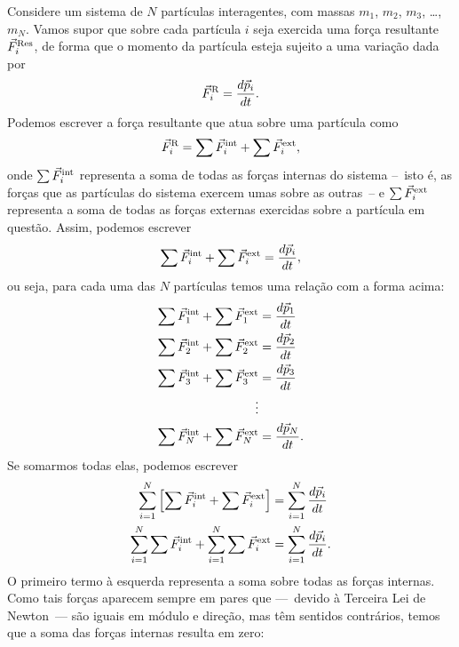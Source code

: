 Considere um sistema de $N$ partículas interagentes, com massas $m_1$, $m_2$, $m_3$, \dots, $m_N$. Vamos supor que sobre cada partícula $i$ seja exercida uma força resultante $\vec{F}_i^{\rm{Res}}$, de forma que o momento da partícula esteja sujeito a uma variação dada por
\begin{equation}
    \vec{F}_i^{\rm{R}} = \frac{d\vec{p}_i}{dt}.
\end{equation}
%
Podemos escrever a força resultante que atua sobre uma partícula como
\begin{equation}
    \vec{F}_i^{\rm{R}} = \sum \vec{F}_i^{\rm{int}} + \sum \vec{F}_i^{\rm{ext}},
\end{equation}
%
onde $\sum\vec{F}_i^{\rm{int}}$ representa a soma de todas as forças internas do sistema --~isto é, as forças que as partículas do sistema exercem umas sobre as outras~-- e $\sum\vec{F}_i^{\rm{ext}}$ representa a soma de todas as forças externas exercidas sobre a partícula em questão. Assim, podemos escrever
\begin{equation}
    \sum\vec{F}_i^{\rm{int}} + \sum\vec{F}_i^{\rm{ext}} = \frac{d\vec{p}_i}{dt},
\end{equation}
%
ou seja, para cada uma das $N$ partículas temos uma relação com a forma acima:
\begin{align}
    \sum\vec{F}_1^{\rm{int}} + \sum\vec{F}_1^{\rm{ext}} &= \frac{d\vec{p}_1}{dt} \\
    \sum\vec{F}_2^{\rm{int}} + \sum\vec{F}_2^{\rm{ext}} &= \frac{d\vec{p}_2}{dt} \\
    \sum\vec{F}_3^{\rm{int}} + \sum\vec{F}_3^{\rm{ext}} &= \frac{d\vec{p}_3}{dt} \\
    \vdots \\
    \sum\vec{F}_N^{\rm{int}} + \sum\vec{F}_N^{\rm{ext}} &= \frac{d\vec{p}_N}{dt}.
\end{align}
%
Se somarmos todas elas, podemos escrever
\begin{align}
    \sum_{i=1}^N \left[\sum\vec{F}_i^{\rm{int}} + \sum\vec{F}_i^{\rm{ext}}\right] &= \sum_{i=1}^N \frac{d\vec{p}_i}{dt} \\
    \sum_{i=1}^N \sum\vec{F}_i^{\rm{int}} + \sum_{i=1}^N \sum\vec{F}_i^{\rm{ext}} &= \sum_{i=1}^N \frac{d\vec{p}_i}{dt}.
\end{align}
%
O primeiro termo à esquerda representa a soma sobre todas as forças internas. Como tais forças aparecem sempre em pares que ---~devido à Terceira Lei de Newton~--- são iguais em módulo e direção, mas têm sentidos contrários, temos que a soma das forças internas resulta em zero:
